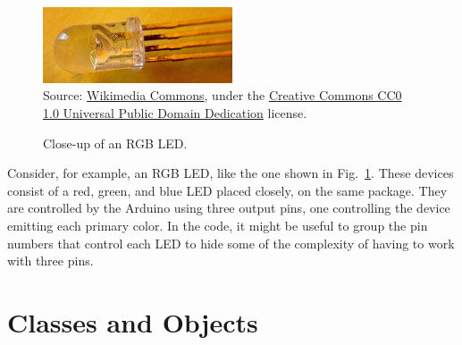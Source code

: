 \begin{figure}[b]
  \centering
  \includegraphics[width=0.5\textwidth]{img/RGB_led_detail.jpg}
  \\ \scriptsize
  Source: \href{https://commons.wikimedia.org/wiki/File%3ARGB_led_detail.jpg}{Wikimedia Commons}, under the \href{https://creativecommons.org/publicdomain/zero/1.0/deed.en}{Creative Commons CC0 1.0 Universal Public Domain Dedication} license.
  \caption{Close-up of an RGB LED.}
  \label{fig:rgb-led}
\end{figure}

Consider, for example, an RGB LED, like the one shown in Fig.~\ref{fig:rgb-led}.
These devices consist of a red, green, and blue LED placed closely, on the same package.
They are controlled by the Arduino using three output pins, one controlling the device emitting each primary color.
In the code, it might be useful to group the pin numbers that control each LED to hide some of the complexity of having to work with three pins.

\section{Classes and Objects}


